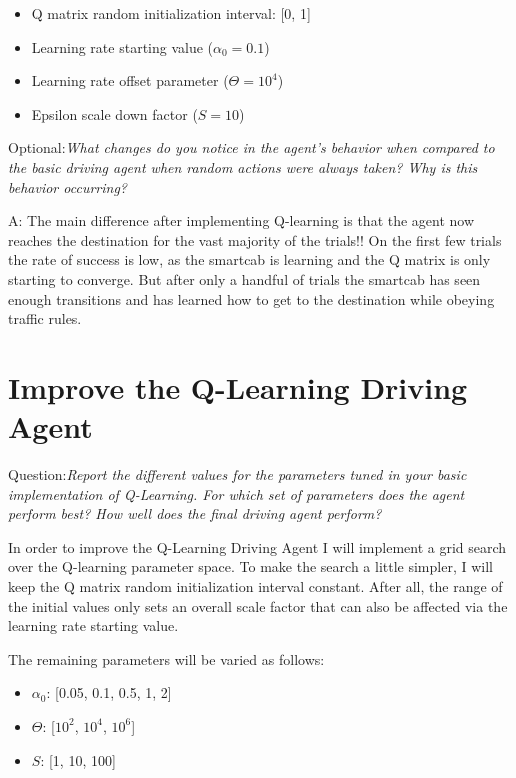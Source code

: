 \documentclass[conference]{IEEEtran}
\begin{document}
\begin{itemize}
\item Q matrix random initialization interval: [0, 1]

\item Learning rate starting value ($\alpha_{0}=0.1$)

\item Learning rate offset parameter ($\Theta=10^{4}$)

\item Epsilon scale down factor ($S=10$)
\end{itemize}

\vspace{1em} \noindent Optional:\textit{What changes do you notice in the
agent's behavior when compared to the basic driving agent when random actions
were always taken? Why is this behavior occurring?}

\vspace{2em} \noindent A: The main difference after implementing Q-learning is
that the agent now reaches the destination for the vast majority of the
trials!!  On the first few trials the rate of success is low, as the smartcab
is learning and the Q matrix is only starting to converge. But after only a
handful of trials the smartcab has seen enough transitions and has learned how
to get to the destination while obeying traffic rules. 


\section{Improve the Q-Learning Driving Agent}

\vspace{1em} \noindent Question:\textit{Report the different values for the
parameters tuned in your basic implementation of Q-Learning. For which set of
parameters does the agent perform best? How well does the final driving agent
perform?}

\vspace{2em}
In order to improve the Q-Learning Driving Agent I will implement a grid search
over the Q-learning parameter space.  To make the search a little simpler, I
will keep the Q matrix random initialization interval constant.  After all, the
range of the initial values only sets an overall scale factor that can also be
affected via the learning rate starting value.  

The remaining parameters will be varied as follows:

\begin{itemize}
    \item $\alpha_{0}$:  [0.05, 0.1, 0.5, 1, 2]

    \item $\Theta$:  [$10^2$, $10^4$, $10^6$]

    \item $S$: [1, 10, 100]
\end{itemize}
\end{document}
